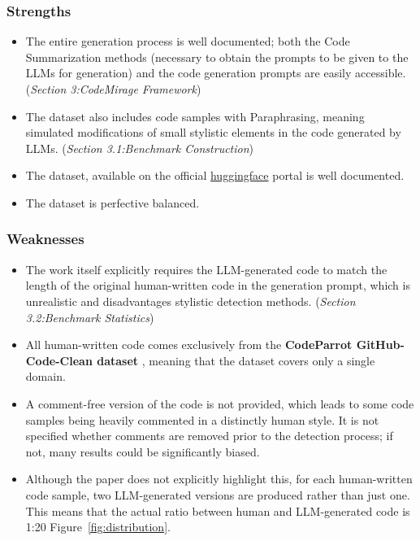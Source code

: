 \subsubsection*{Strengths}
\begin{itemize}
    \item The entire generation process is well documented; both 
    the Code Summarization methods 
    (necessary to obtain the prompts to be given to 
    the LLMs for generation) and the code 
    generation prompts are easily accessible. 
    {(\scriptsize\textit{Section 3:CodeMirage Framework})}
    \item The dataset also includes code samples with Paraphrasing, 
    meaning simulated modifications of small stylistic elements 
    in the code generated by LLMs.
    {(\scriptsize\textit{Section 3.1:Benchmark Construction})}
    \item The dataset, available on the official 
    \href{{https://huggingface.co/datasets/HanxiGuo/CodeMirage}}{huggingface} 
    portal is well documented.
    \item The dataset is perfective balanced.
\end{itemize}



\subsubsection*{Weaknesses}
\begin{itemize}
    \item The work itself explicitly requires the LLM-generated 
    code to match the length of the original human-written 
    code in the generation prompt, which is unrealistic and 
    disadvantages stylistic detection methods.
    {(\scriptsize\textit{Section 3.2:Benchmark Statistics})}
    \item All human-written code comes exclusively from the 
    \textbf{CodeParrot GitHub-Code-Clean dataset} 
    \cite{codeparrot-github-code-clean-2022}, 
    meaning that the dataset covers only a single domain.
    \item A comment-free version of the code is not provided, 
    which leads to some code samples being heavily 
    commented in a distinctly human style. 
    It is not specified whether comments are removed prior to the 
    detection process; if not, many results could be 
    significantly biased.
    \item Although the paper does not explicitly highlight this, for each 
    human-written code sample, two LLM-generated versions are produced 
    rather than just one. This means that the actual ratio between human 
    and LLM-generated code is 1:20 Figure~\ref{fig:distribution}. 
\end{itemize}



